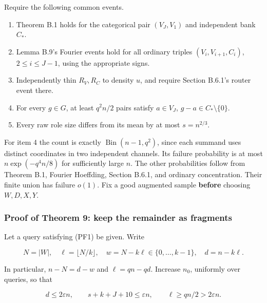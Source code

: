 \documentclass[11pt,a4paper]{article}
\providecommand{\tightlist}{\setlength{\itemsep}{0pt}\setlength{\parskip}{0pt}}
\begin{document}
Require the following common events.

\begin{enumerate}
\def\labelenumi{\arabic{enumi}.}
\tightlist
\item
  Theorem B.1 holds for the categorical pair \((V_J,V_1)\) and independent bank \(C_*\).
\item
  Lemma B.9's Fourier events hold for all ordinary triples \((V_i,V_{i+1},C_i)\), \(2\le i\le J-1\), using the appropriate signs.
\item
  Independently thin \(R_V,R_C\) to density \(u\), and require Section B.6.1's router event there.
\item
  For every \(g\in G\), at least \(q^2n/2\) pairs satisfy \(a\in V_J\), \(g-a\in C_*\setminus\{0\}\).
\item
  Every raw role size differs from its mean by at most \(s=n^{2/3}\).
\end{enumerate}

For item 4 the count is exactly \(\operatorname{Bin}(n-1,q^2)\), since each summand uses distinct coordinates in two independent channels. Its failure probability is at most \(n\exp(-q^4n/8)\) for sufficiently large \(n\). The other probabilities follow from Theorem B.1, Fourier Hoeffding, Section B.6.1, and ordinary concentration. Their finite union has failure \(o(1)\). Fix a good augmented sample \textbf{before} choosing \(W,D,X,Y\).

\hypertarget{proof-of-theorem-9-keep-the-remainder-as-fragments}{%
\subsubsection{Proof of Theorem 9: keep the remainder as fragments}\label{proof-of-theorem-9-keep-the-remainder-as-fragments}}

Let a query satisfying (PF1) be given. Write

\begin{equation}
N=|W|,\quad \ell=\lfloor N/k\rfloor,\quad
w=N-k\ell\in\{0,\ldots,k-1\},\quad d=n-k\ell.
\tag{PF6}\label{eq:PF6}
\end{equation}

In particular, \(n-N=d-w\) and \(\ell=qn-qd\). Increase \(n_0\), uniformly over queries, so that

\begin{equation}
d\le2\varepsilon n,\qquad s+k+J+10\le\varepsilon n,
\qquad \ell\ge qn/2>2\varepsilon n.
\tag{PF7}\label{eq:PF7}
\end{equation}
\end{document}
